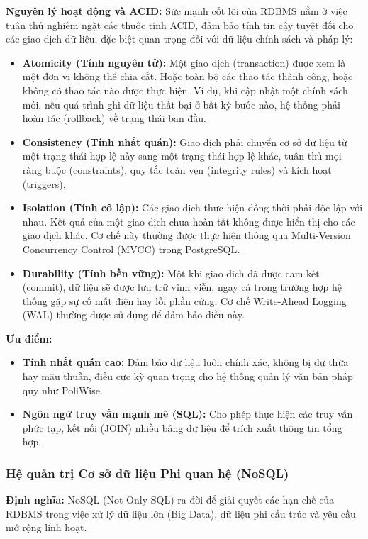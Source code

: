 \documentclass[12pt,a4paper]{report}
\begin{document}
\textbf{Nguyên lý hoạt động và ACID:} Sức mạnh cốt lõi của RDBMS nằm ở việc tuân thủ nghiêm ngặt các thuộc tính ACID, đảm bảo tính tin cậy tuyệt đối cho các giao dịch dữ liệu, đặc biệt quan trọng đối với dữ liệu chính sách và pháp lý:
\begin{itemize}
    \item \textbf{Atomicity (Tính nguyên tử):} Một giao dịch (transaction) được xem là một đơn vị không thể chia cắt. Hoặc toàn bộ các thao tác thành công, hoặc không có thao tác nào được thực hiện. Ví dụ, khi cập nhật một chính sách mới, nếu quá trình ghi dữ liệu thất bại ở bất kỳ bước nào, hệ thống phải hoàn tác (rollback) về trạng thái ban đầu.
    \item \textbf{Consistency (Tính nhất quán):} Giao dịch phải chuyển cơ sở dữ liệu từ một trạng thái hợp lệ này sang một trạng thái hợp lệ khác, tuân thủ mọi ràng buộc (constraints), quy tắc toàn vẹn (integrity rules) và kích hoạt (triggers).
    \item \textbf{Isolation (Tính cô lập):} Các giao dịch thực hiện đồng thời phải độc lập với nhau. Kết quả của một giao dịch chưa hoàn tất không được hiển thị cho các giao dịch khác. Cơ chế này thường được thực hiện thông qua Multi-Version Concurrency Control (MVCC) trong PostgreSQL.
    \item \textbf{Durability (Tính bền vững):} Một khi giao dịch đã được cam kết (commit), dữ liệu sẽ được lưu trữ vĩnh viễn, ngay cả trong trường hợp hệ thống gặp sự cố mất điện hay lỗi phần cứng. Cơ chế Write-Ahead Logging (WAL) thường được sử dụng để đảm bảo điều này.
\end{itemize}

\textbf{Ưu điểm:}
\begin{itemize}
    \item \textbf{Tính nhất quán cao:} Đảm bảo dữ liệu luôn chính xác, không bị dư thừa hay mâu thuẫn, điều cực kỳ quan trọng cho hệ thống quản lý văn bản pháp quy như PoliWise.
    \item \textbf{Ngôn ngữ truy vấn mạnh mẽ (SQL):} Cho phép thực hiện các truy vấn phức tạp, kết nối (JOIN) nhiều bảng dữ liệu để trích xuất thông tin tổng hợp.
\end{itemize}

\subsubsection{Hệ quản trị Cơ sở dữ liệu Phi quan hệ (NoSQL)}
\textbf{Định nghĩa:} NoSQL (Not Only SQL) ra đời để giải quyết các hạn chế của RDBMS trong việc xử lý dữ liệu lớn (Big Data), dữ liệu phi cấu trúc và yêu cầu mở rộng linh hoạt.
\end{document}
